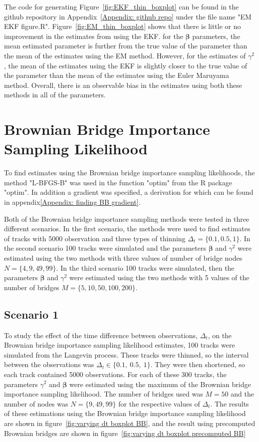 The code for generating Figure~\ref{fig:EKF_thin_boxplot} can be found in the github repository in Appendix~\ref{Appendix: github repo} under the file name "EM EKF figure.R". Figure~\ref{fig:EM_thin_boxplot} shows that there is little or no improvement in the estimates from using the EKF. for the $\bm \beta$ parameters, the mean estimated parameter is further from the true value of the parameter than the mean of the estimates using the EM method. However, for the estimates of $\gamma^2$, the mean of the estimates using the EKF is slightly closer to the true value of the parameter than the mean of the estimates using the Euler Maruyama method. Overall, there is an observable bias in the estimates using both these methods in all of the parameters.

\section{Brownian Bridge Importance Sampling Likelihood}
\label{sec: BB test}
To find estimates using the Brownian bridge importance sampling likelihoods, the method "L-BFGS-B" was used in the function "optim" from the R package "optim". In addition a gradient was specified, a derivation for which can be found in appendix\ref{Appendix: finding BB gradient}. 


Both of the Brownian bridge importance sampling methods were tested in three different scenarios. In the first scenario, the methods were used to find estimates of tracks with 5000 observation and three types of thinning $\Delta_t =\{0.1, 0.5, 1\}$. In the second scenario 100 tracks were simulated and the parameters $\bm \beta$ and $\gamma^2$ were estimated using the two methods with three values of number of bridge nodes $N=\{4, 9, 49, 99\}$. In the third scenario 100 tracks were simulated, then the parameters $\bm \beta$ and $\gamma^2$ were estimated using the two methods with 5 values of the number of bridges $M=\{5,10,50,100,200\}$. 


\subsection{Scenario 1}
To study the effect of the time difference between observations, $\Delta_t$, on the Brownian bridge importance sampling likelihood estimates, 100 tracks were simulated from the Langevin process. These tracks were thinned, so the interval between the observations was $\Delta_t \in \{0.1, \ 0.5, \ 1\}$. They were then shortened, so each track contained 5000 observations. For each of these 300 tracks, the parameters $\gamma^2$ and $\bm \beta$ were estimated using the maximum of the Brownian bridge importance sampling likelihood. The number of bridges used was $M=50$ and the number of nodes was $N =\{9,49,99\}$ for the respective values of $\Delta_t$. The results of these estimations using the Brownian bridge importance sampling likelihood are shown in figure~\ref{fig:varying dt boxplot BB}, and the result using precomputed Brownian bridges are shown in figure~\ref{fig:varying dt boxplot precomputed BB}

